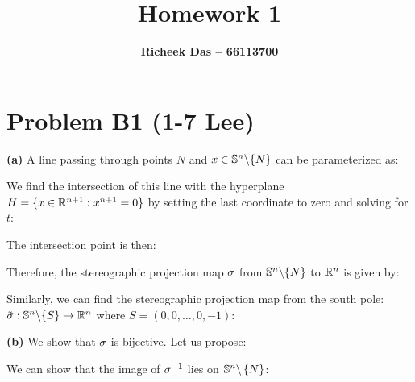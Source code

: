 \documentclass[12pt,letterpaper]{article}
\title{Homework 1}
\author{\textbf{Richeek Das -- 66113700}}
\renewcommand \paragraph[1] {\medskip \noindent \textbf{#1}}
\begin{document}
\maketitle

\section*{Problem B1 (1-7 Lee)}

\paragraph{(a)} A line passing through points $N$ and $x \in \mathbb{S}^n \backslash \{N\}$ can be parameterized as:

We find the intersection of this line with the hyperplane $H = \{x \in \mathbb{R}^{n+1} : x^{n+1} = 0\}$ by setting the last coordinate to zero and solving for $t$:

The intersection point is then:

Therefore, the stereographic projection map $\sigma$ from $\mathbb{S}^n \backslash \{N\}$ to $\mathbb{R}^n$ is given by:

Similarly, we can find the stereographic projection map from the south pole: $\tilde{\sigma}: \mathbb{S}^n \backslash \{S\} \to \mathbb{R}^n$ where $S = (0,0,\ldots,0,-1)$:

\paragraph{(b)} We show that $\sigma$ is bijective. Let us propose:

We can show that the image of $\sigma^{-1}$ lies on $\mathbb{S}^n \backslash \left\{N\right\}$:
\end{document}

